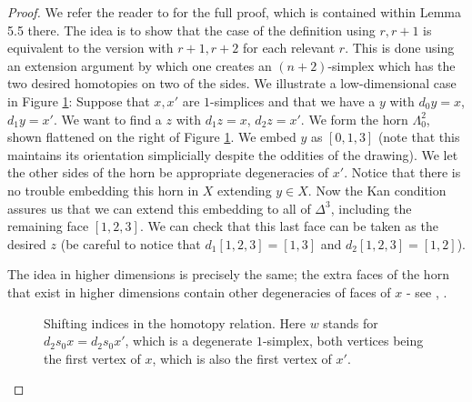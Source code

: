 \documentclass[12pt]{article}
\theoremstyle{plain}
\theoremstyle{definition}
\theoremstyle{remark}
\begin{document}
\begin{proof}
We refer the reader to \cite{MAY67} for the full proof, which is contained within Lemma 5.5 there. The idea is to show that the case of the definition using $r, r+1$ is equivalent to the version with $r+1, r+2$ for each relevant $r$. This is done using an extension argument by which one creates an $(n+2)$-simplex which has the two desired homotopies on two of the sides. We illustrate a low-dimensional case in Figure \ref{F: fig25}: Suppose that $x, x'$ are $1$-simplices and that we have a $y$ with $d_0y=x$, $d_1y=x'$. We want to find a $z$ with $d_1z=x$, $ d_2z=x'$. We form the horn $\Lambda^2_0$, shown flattened on the right of Figure \ref{F: fig25}. We embed $y$ as $[0,1,3]$ (note that this maintains its orientation simplicially despite the oddities of the drawing). We let the other sides of the horn be appropriate degeneracies of $x'$. Notice that there is no trouble embedding this horn in $X$  extending $y\in X$. Now the Kan condition assures us that we can extend this embedding to all of $\Delta^3$, including the remaining face $[1,2,3]$. We can check that this last face can be taken as the desired $z$ (be careful to notice that $d_1[1,2,3]=[1,3]$ and $d_2[1,2,3]=[1,2]$). 

The idea in higher dimensions is precisely the same; the extra  faces of the horn that exist in higher dimensions contain other degeneracies of faces of $x$ - see \cite[Lemma 5.5]{MAY67}, \cite[Proposition 1.19]{Cu71}.
\begin{figure}[!htp]
\begin{center}
\end{center}
\caption{Shifting indices in the homotopy relation. Here $w$ stands for  $d_2s_0x=d_2s_0x'$, which is a degenerate $1$-simplex, both vertices being the first vertex of $x$, which is also the first vertex of $x'$.}\label{F: fig25}
\end{figure}
\end{proof}
\end{document}
